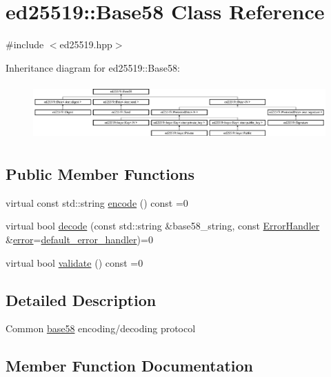 \hypertarget{classed25519_1_1_base58}{}\section{ed25519\+:\+:Base58 Class Reference}
\label{classed25519_1_1_base58}


{\ttfamily \#include $<$ed25519.\+hpp$>$}

Inheritance diagram for ed25519\+:\+:Base58\+:\begin{figure}[H]
\begin{center}
\leavevmode
\includegraphics[height=2.162162cm]{classed25519_1_1_base58}
\end{center}
\end{figure}
\subsection*{Public Member Functions}
\begin{DoxyCompactItemize}
\item 
virtual const std\+::string \mbox{\hyperlink{classed25519_1_1_base58_a1b52a018a5215e2dcf2aa388b0fe06bf}{encode}} () const =0
\item 
virtual bool \mbox{\hyperlink{classed25519_1_1_base58_a3cb74be32923dcfb03a24b65015bee84}{decode}} (const std\+::string \&base58\+\_\+string, const \mbox{\hyperlink{namespaceed25519_a6ba572942b3c18591fc869d52a6b16e6}{Error\+Handler}} \&\mbox{\hyperlink{namespaceed25519_ac93d0b5156eaca22197055e902920bc4}{error}}=\mbox{\hyperlink{namespaceed25519_a7c7bb6ed17541162959c33ed3e3b15fb}{default\+\_\+error\+\_\+handler}})=0
\item 
virtual bool \mbox{\hyperlink{classed25519_1_1_base58_addfdb1d6d0f7e7f0cd0cf5dd2ee193bb}{validate}} () const =0
\end{DoxyCompactItemize}


\subsection{Detailed Description}
Common \mbox{\hyperlink{namespaceed25519_1_1base58}{base58}} encoding/decoding protocol 

\subsection{Member Function Documentation}
\mbox{\label{classed25519_1_1_base58_a3cb74be32923dcfb03a24b65015bee84}} 
